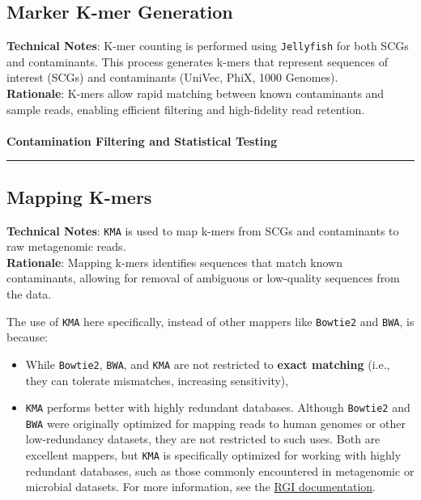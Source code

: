\documentclass[11pt]{report}
\begin{document}
{\subsection{Marker K-mer Generation} \textbf{Technical Notes}: K-mer counting is performed using \texttt{Jellyfish} for both SCGs and contaminants. This process generates k-mers that represent sequences of interest (SCGs) and contaminants (UniVec, PhiX, 1000 Genomes).\\ \textbf{Rationale}: K-mers allow rapid matching between known contaminants and sample reads, enabling efficient filtering and high-fidelity read retention. 
\\
\\
\textbf{Contamination Filtering and Statistical Testing} \\ \rule{\linewidth}{0.5mm} 

\subsection{Mapping K-mers} \textbf{Technical Notes}: \texttt{KMA} is used to map k-mers from SCGs and contaminants to raw metagenomic reads. \\
\textbf{Rationale}: Mapping k-mers identifies sequences that match known contaminants, allowing for removal of ambiguous or low-quality sequences from the data. 

\begin{tcolorbox}[coltitle=white, title=Personal Notes]
	The use of \texttt{KMA} here specifically, instead of other mappers like \texttt{Bowtie2} and \texttt{BWA}, is because:
	\begin{itemize}
		\item While \texttt{Bowtie2}, \texttt{BWA}, and \texttt{KMA} are not restricted to \textbf{exact matching} (i.e., they can tolerate mismatches, increasing sensitivity),
		\item \texttt{KMA} performs better with highly redundant databases. Although \texttt{Bowtie2} and \texttt{BWA} were originally optimized for mapping reads to human genomes or other low-redundancy datasets, they are not restricted to such uses. Both are excellent mappers, but \texttt{KMA} is specifically optimized for working with highly redundant databases, such as those commonly encountered in metagenomic or microbial datasets. For more information, see the \href{https://github.com/arpcard/rgi/blob/master/docs/rgi_bwt.rst}{RGI documentation}.
	\end{itemize}
\end{tcolorbox}




}
\end{document}
